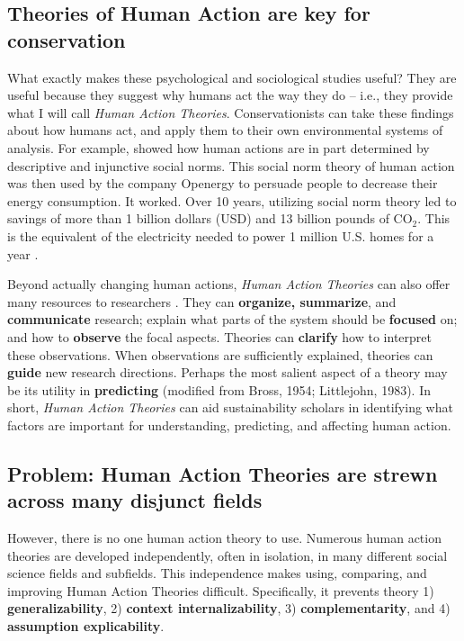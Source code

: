 \documentclass[12 pt]{article}
\begin{document}
\subsection{Theories of Human Action are key for conservation}
What exactly makes these psychological and sociological studies useful? They are useful because they suggest why humans act the way they do -- i.e., they provide what I will call \textit{Human Action Theories}.  Conservationists can take these findings about how humans act, and apply them to their own environmental systems of analysis. For example,  \textcite{Schultz2007} showed how human actions are in part determined by descriptive and injunctive social norms. This social norm theory of human action was then used by the company Openergy to persuade people to decrease their energy consumption. It worked. Over 10 years, utilizing social norm theory led to savings of more than  1 billion  dollars (USD) and 13 billion pounds of CO$_{\text{2}}$. This is the equivalent of the electricity needed to power 1 million U.S. homes for a year \parencite{Schultz2018}. 

Beyond actually changing human actions, \textit{Human Action Theories} can also offer many resources to researchers \parencite{Fawcett1978}. They can \textbf{organize, summarize}, and \textbf{communicate} research; explain what parts of the system should be \textbf{focused} on; and how to \textbf{observe} the focal aspects. Theories can \textbf{clarify} how to interpret these observations. When observations are sufficiently explained, theories can \textbf{guide} new research directions.  Perhaps  the most salient aspect of a theory may be its utility in \textbf{predicting} (modified from Bross, 1954; Littlejohn, 1983). In short, \textit{Human Action Theories} can aid sustainability scholars in identifying what factors are important for understanding, predicting, and affecting human action. 

\subsection{Problem: Human Action Theories are strewn across many disjunct fields}

However, there is no one human action theory to use.  Numerous human action theories are developed independently,  often in isolation, in many different social science fields and subfields. This independence makes using, comparing, and improving Human Action Theories difficult. Specifically, it prevents theory 1) \textbf{generalizability}, 2) \textbf{context internalizability}, 3) \textbf{complementarity}, and 4) \textbf{assumption explicability}.
\end{document}
